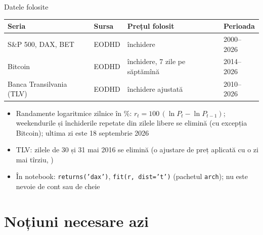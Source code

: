 \begin{frame}{Datele folosite}
\itemsize{\small}
\begin{center}
\footnotesize
\begin{tabular}{llll}
\toprule
\textbf{Seria} & \textbf{Sursa} & \textbf{Prețul folosit} & \textbf{Perioada} \\
\midrule
S\&P 500, DAX, BET & EODHD & închidere & 2000--2026 \\
Bitcoin & EODHD & închidere, 7 zile pe săptămînă & 2014--2026 \\
Banca Transilvania (TLV) & EODHD & închidere ajustată & 2010--2026 \\
\bottomrule
\end{tabular}
\end{center}
\begin{itemize}
    \item Randamente logaritmice zilnice în \%: $r_t = 100\,(\ln P_t - \ln P_{t-1})$; weekendurile și închiderile repetate din zilele libere se elimină (cu excepția Bitcoin); ultima zi este 18 septembrie 2026
    \item TLV: zilele de 30 și 31 mai 2016 se elimină (o ajustare de preț aplicată cu o zi mai tîrziu, )
    \item În notebook: \texttt{returns('dax')}, \texttt{fit(r, dist='t')} (pachetul \texttt{arch}); nu este nevoie de cont sau de cheie
\end{itemize}
\end{frame}


\section{Noțiuni necesare azi}

